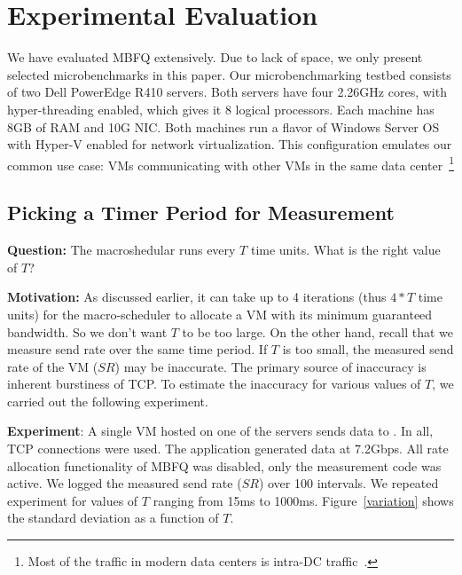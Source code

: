 \section{Experimental Evaluation}
\label{sec:experiments}

We have evaluated MBFQ extensively. Due to lack of space, we only present
selected microbenchmarks in this paper. Our microbenchmarking testbed consists
of two Dell PowerEdge R410 servers.  Both servers have four 2.26GHz cores, with
hyper-threading enabled, which gives it 8 logical processors.  Each machine has
8GB of RAM and 10G NIC.  Both machines run a flavor of Windows Server OS with
Hyper-V enabled for network virtualization. This configuration emulates our
common use case: VMs communicating with other VMs in the same data
center~\footnote{Most of the traffic in modern data centers is intra-DC
traffic~\cite{fb,cosmos}.} 

\subsection{Picking a Timer Period for Measurement}
{\bf Question:}  The macroshedular runs every $T$ time units. What is the right
value of $T$?

{\bf Motivation:}  As discussed earlier, it can take up to 4 iterations (thus
$4*T$ time units) for the macro-scheduler to allocate a VM with its minimum
guaranteed bandwidth. So we don't want $T$ to be too large. On the other hand,
recall that we measure send rate over the same time period. If $T$ is too small,
the measured send rate of the VM ($SR$) may be inaccurate. The primary source of
inaccuracy is inherent burstiness of TCP. To estimate the inaccuracy for
various values of $T$, we carried out the following experiment.

{\bf Experiment}: A single VM hosted on one of the servers sends data to
. In all, 
TCP connections were used. The application generated data at 7.2Gbps. All rate
allocation functionality of MBFQ was disabled, only the measurement code was
active.  We logged the measured send rate ($SR$) over 100 intervals.  We
repeated experiment for values of $T$ ranging from 15ms to 1000ms.
Figure~\ref{variation} shows the standard deviation as a function of $T$.  

